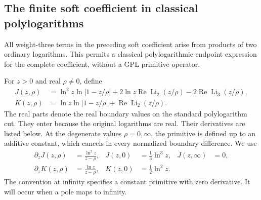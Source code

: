 \subsection{The finite soft coefficient in classical polylogarithms}
\label{sec:comp-ck-classical}
All weight-three terms in the preceding soft coefficient arise from
products of two ordinary logarithms.  This permits a classical
polylogarithmic endpoint expression for the complete coefficient,
without a GPL primitive operator.

For $z>0$ and real $\rho\ne0$, define
\begin{align}
 J(z,\rho)&=\ln^2z\ln|1-z/\rho|
 +2\ln z\operatorname{Re}\operatorname{Li}_2(z/\rho)
 -2\operatorname{Re}\operatorname{Li}_3(z/\rho),\\
 K(z,\rho)&=\ln z\ln|1-z/\rho|
 +\operatorname{Re}\operatorname{Li}_2(z/\rho).
\end{align}
The real parts denote the real boundary values on the standard
polylogarithm cut.  They enter because the original logarithms are real.
Their derivatives are listed below. At the degenerate values
$\rho=0,\infty$, the primitive is defined up to an additive constant,
which cancels in every normalized boundary difference. We use
\begin{align}
 \partial_z J(z,\rho)&=\frac{\ln^2z}{z-\rho},&
 J(z,0)&=\frac13\ln^3z,&J(z,\infty)&=0,\\
 \partial_z K(z,\rho)&=\frac{\ln z}{z-\rho},&
 K(z,0)&=\frac12\ln^2z.
\end{align}
The convention at infinity specifies a constant primitive with zero
derivative.  It will occur when a pole maps to infinity.

